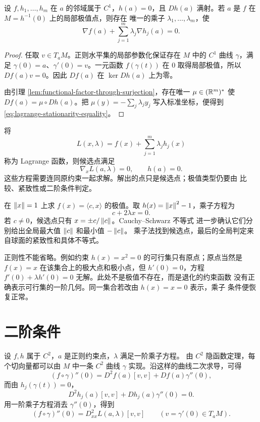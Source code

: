 \begin{theorem}
\label{thm:lagrange-multipliers-regular-equality}
设 $f,h_1,\ldots,h_m$ 在 $a$ 的邻域属于 $C^1$，$h(a)=0$，且
$Dh(a)$ 满射。若 $a$ 是 $f$ 在 $M=h^{-1}(0)$ 上的局部极值点，则存在
唯一的乘子 $\lambda_1,\ldots,\lambda_m$，使
\begin{equation}
 \nabla f(a)+\sum_{j=1}^m\lambda_j\nabla h_j(a)=0.
 \label{eq:lagrange-stationarity-equality}
\end{equation}
\end{theorem}

\begin{proof}
任取 $v\in T_aM$。正则水平集的局部参数化保证存在 $M$ 中的 $C^1$ 曲线
$\gamma$，满足 $\gamma(0)=a$、$\gamma'(0)=v$。一元函数
$f(\gamma(t))$ 在 $0$ 取得局部极值，所以
$Df(a)v=0$。因此 $Df(a)$ 在 $\ker Dh(a)$ 上为零。

由引理 \ref{lem:functional-factor-through-surjection}，存在唯一
$\mu\in(\mathbb{R}^m)^*$ 使 $Df(a)=\mu\circ Dh(a)$。把
$\mu(y)=-\sum_j\lambda_jy_j$ 写入标准坐标，便得到
\eqref{eq:lagrange-stationarity-equality}。
\end{proof}

将
\[
 L(x,\lambda)=f(x)+\sum_{j=1}^m\lambda_jh_j(x)
\]
称为 Lagrange 函数，则候选点满足
\[
 \nabla_xL(a,\lambda)=0,\qquad h(a)=0.
\]
这些方程需要连同原约束一起求解。解出的点只是候选点；极值类型仍要由
比较、紧致性或二阶条件判定。

\begin{example}[球面上的线性函数]
在 $\left\lVert x\right\rVert=1$ 上求 $f(x)=\langle c,x\rangle$ 的极值。取
$h(x)=\left\lVert x\right\rVert^2-1$，乘子方程为
\[
 c+2\lambda x=0.
\]
若 $c\ne0$，候选点只有 $x=\pm c/\left\lVert c\right\rVert$。Cauchy--Schwarz 不等式
进一步确认它们分别给出全局最大值 $\left\lVert c\right\rVert$ 和最小值 $-\left\lVert c\right\rVert$。
乘子法找到候选点，最后的全局判定来自球面的紧致性和具体不等式。
\end{example}

正则性不能省略。例如约束 $h(x)=x^2=0$ 的可行集只有原点；原点当然是
$f(x)=x$ 在该集合上的极大点和极小点，但 $h'(0)=0$，方程
$f'(0)+\lambda h'(0)=0$ 无解。此处不是极值不存在，而是退化的约束函数
没有正确表示可行集的一阶几何。同一集合若改由 $h(x)=x=0$ 表示，乘子
条件便恢复正常。

\section{二阶条件}

设 $f,h$ 属于 $C^2$，$a$ 是正则约束点，$\lambda$ 满足一阶乘子方程。
由 \(C^2\) 隐函数定理，每个切向量都可以由 \(M\) 中一条
\(C^2\) 曲线 \(\gamma\) 实现。沿这样的曲线二次求导，可得
\[
 (f\circ\gamma)''(0)
 =D^2f(a)[v,v]+Df(a)\gamma''(0),
\]
而由 $h_j(\gamma(t))=0$，
\[
 D^2h_j(a)[v,v]+Dh_j(a)\gamma''(0)=0.
\]
用一阶乘子方程消去 $\gamma''(0)$，得到
\begin{equation}
 (f\circ\gamma)''(0)=D^2_{xx}L(a,\lambda)[v,v]
 \qquad(v=\gamma'(0)\in T_aM).
 \label{eq:constrained-second-variation}
\end{equation}


